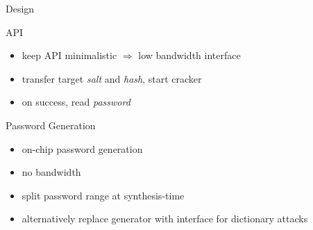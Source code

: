 \begin{frame}{Design}
    \begin{block}{API}
      \begin{itemize}
        \item keep API minimalistic $\Rightarrow$ low bandwidth interface
        \item transfer target \emph{salt} and \emph{hash}, start cracker
        \item on success, read \emph{password}
      \end{itemize}
    \end{block}
    \begin{block}{Password Generation}
      \begin{itemize}
        \item on-chip password generation
        \item no bandwidth
        \item split password range at synthesis-time
      \end{itemize}
      \begin{itemize}
        \item alternatively replace generator with interface for dictionary attacks
      \end{itemize}
    \end{block}
\end{frame}

